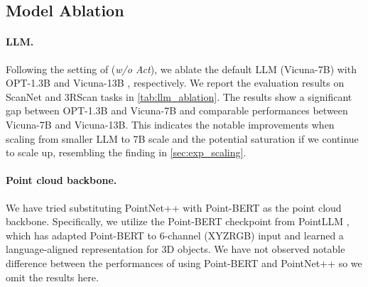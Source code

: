 \begin{table}[t!]
\centering
{}
\label{tab:mask3d_gap}
\end{table}

\subsection{Model Ablation}\label{sec:model_ablation}
\paragraph{LLM.} Following the setting of \agent (\textit{w/o Act}), we ablate the default LLM (Vicuna-7B) with OPT-1.3B \citep{zhang2022opt} and Vicuna-13B \citep{vicuna2023}, respectively. We report the evaluation results on ScanNet and 3RScan tasks in \cref{tab:llm_ablation}. The results show a significant gap between OPT-1.3B and Vicuna-7B and comparable performances between Vicuna-7B and Vicuna-13B. This indicates the notable improvements when scaling from smaller LLM to 7B scale and the potential saturation if we continue to scale up, resembling the finding in \cref{sec:exp_scaling}.

\paragraph{Point cloud backbone.} We have tried substituting PointNet++ \citep{qi2017pointnet++} with Point-BERT \citep{yu2022point} as the point cloud backbone. Specifically, we utilize the Point-BERT checkpoint from PointLLM \citep{xu2023pointllm}, which has adapted Point-BERT to 6-channel (XYZRGB) input and learned a language-aligned representation for 3D objects. We have not observed notable difference between the performances of using Point-BERT and PointNet++ so we omit the results here.

